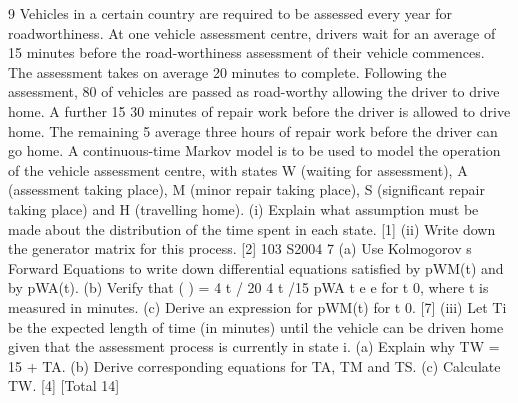 
9 Vehicles in a certain country are required to be assessed every year for roadworthiness.
At one vehicle assessment centre, drivers wait for an average of 15
minutes before the road-worthiness assessment of their vehicle commences. The
assessment takes on average 20 minutes to complete. Following the assessment, 80%
of vehicles are passed as road-worthy allowing the driver to drive home. A further
15%
30 minutes of repair work before the driver is allowed to drive home. The remaining
5%
average three hours of repair work before the driver can go home.
A continuous-time Markov model is to be used to model the operation of the vehicle
assessment centre, with states W (waiting for assessment), A (assessment taking
place), M (minor repair taking place), S (significant repair taking place) and H
(travelling home).
(i) Explain what assumption must be made about the distribution of the time
spent in each state. [1]
(ii) Write down the generator matrix for this process. [2]
103 S2004 7
(a) Use Kolmogorov s Forward Equations to write down differential
equations satisfied by pWM(t) and by pWA(t).
(b) Verify that ( ) = 4 t / 20 4 t /15
pWA t e e for t 0, where t is measured in
minutes.
(c) Derive an expression for pWM(t) for t 0.
[7]
(iii) Let Ti be the expected length of time (in minutes) until the vehicle can be
driven home given that the assessment process is currently in state i.
(a) Explain why TW = 15 + TA.
(b) Derive corresponding equations for TA, TM and TS.
(c) Calculate TW.
[4]
[Total 14]


